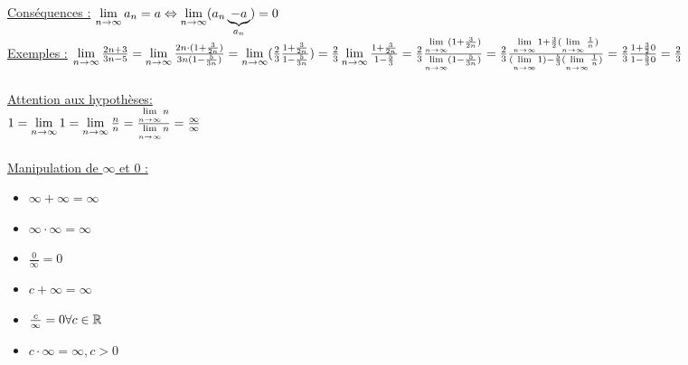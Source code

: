 \documentclass[12pt,a4paper]{article}
\begin{document}
{\underline{Conséquences :} $\lim\limits_{n \to \infty} a_n = a \Leftrightarrow \lim\limits_{n \to \infty}(a_n \underbrace{-a}_{a_n}) = 0$\\
\underline{Exemples :} 
$\lim\limits_{n \to \infty}\frac{2n+3}{3n-5} = 
\lim\limits_{n \to \infty}\frac{2n\cdot (1+ \frac{3}{2n})}{3n(1-\frac{5}{3n})} = 
\lim\limits_{n \to \infty}(\frac{2}{3} \frac{1+\frac{3}{2n}}{1-\frac{5}{3n}}) = 
\frac{2}{3} \lim\limits_{n \to \infty} \frac{1+ \frac{3}{2n}}{1- \frac{5}{3}} = 
\frac{2}{3} \frac{\lim\limits_{n \to \infty}(1+ \frac{3}{2n})}{\lim\limits_{n \to \infty} (1-\frac{5}{3n})} =
\frac{2}{3} \frac{\lim\limits_{n \to \infty} 1 + \frac{3}{2}(\lim\limits_{n \to \infty}\frac{1}{n})}{(\lim\limits_{n \to \infty}1) - \frac{5}{3} (\lim\limits_{n \to \infty}\frac{1}{n})} 
= \frac{2}{3} \frac{1+\frac{3}{2}0}{1-\frac{5}{3}0} = \frac{2}{3}$\\
\\
\underline{Attention aux hypothèses:}\\
$1 = \lim\limits_{n \to \infty} 1 = \lim\limits_{n \to \infty} \frac{n}{n} = \frac{\lim\limits_{n \to \infty} n}{\lim\limits_{n \to \infty} n} = \frac{\infty}{\infty}$\\
\\
\underline{Manipulation de $\infty$ et 0 :}\\
\begin{itemize}
\item$\infty + \infty = \infty$
\item$\infty\cdot\infty = \infty$
\item$\frac{0}{\infty} = 0$
\item$c + \infty = \infty$
\item$\frac{c}{\infty} = 0 \forall c \in \mathbb{R}$
\item$c \cdot\infty = \infty, c > 0$
\end{itemize}

}
\end{document}
